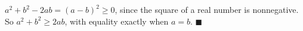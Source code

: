 $a^2+b^2-2ab=(a-b)^2\ge0$, since the square of a real number is nonnegative. So $a^2+b^2\ge2ab$, with equality exactly when $a=b$. $\blacksquare$
